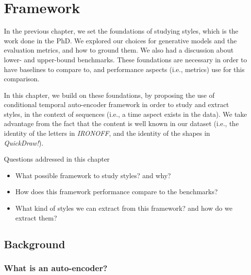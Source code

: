\chapter{Framework} \label{ch:framework}
\minitoc%

\par In the previous chapter, we set the foundations of studying styles, which is the work done in the PhD. We explored our choices for generative models and the evaluation metrics, and how to ground them. We also had a discussion about lower- and upper-bound benchmarks. These foundations are necessary in order to have baselines to compare to, and performance aspects (i.e., metrics) use for this comparison. %

\par In this chapter, we build on these foundations, by proposing the use of conditional temporal auto-encoder framework in order to study and extract styles, in the context of sequences (i.e., a time aspect exists in the data). We take advantage from the fact that the content is well known in our dataset (i.e., the identity of the letters in \textit{IRONOFF}, and the identity of the shapes in \textit{QuickDraw!}).

\begin{mdframed}[backgroundcolor=blue!20]
    \begin{center}
        Questions addressed in this chapter
    \end{center}

    \begin{itemize}
        \item What possible framework to study styles? and why?
        \item How does this framework performance compare to the benchmarks?
        \item What kind of styles we can extract from this framework? and how do we extract them?
    \end{itemize}
\end{mdframed}

\clearpage

\section{Background}
  \subsection{What is an auto-encoder?}\label{sec:autoencoder}

